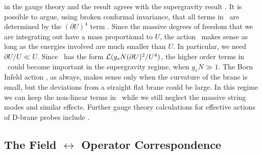 in the gauge theory and the result agrees with the supergravity result
\cite{Douglas:1997yp}. 
It is possible to argue, using broken conformal invariance, 
that all terms in \borninf\  are determined by the $(\partial U)^4 $ 
term \cite{Maldacena:1997re}. 
Since the massive degrees of freedom that we are integrating  out
have a mass proportional to $U$, the action \borninf\ makes sense
as long as the energies involved are much smaller than $U$. 
In particular, we need $\partial U /U \ll U $. Since \borninf\
has the form ${\cal L}( g_s N (\partial U)^2/U^4 )$, the higher order terms
in \borninf\ could become important in the supergravity regime,
when $g_s N \gg 1 $. The Born Infeld action \borninf , as always,
makes sense only when the curvature of the brane is small, but
the deviations from a straight flat brane could be large. In this
regime we can keep the non-linear terms in \borninf\ while
we still neglect the massive string modes and similar effects.
Further gauge theory calculations for effective actions of 
D-brane probes include \cite{Douglas:1998tk,Das:1999ij,Das:1999fx}.


\subsection{The Field $\leftrightarrow$ Operator Correspondence}
\label{field_operator}

